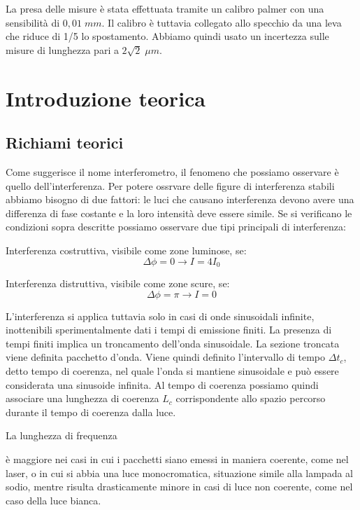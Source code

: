 \documentclass{article}
\begin{document}
La presa delle misure è stata effettuata tramite un calibro palmer con una sensibilità di $0,01 \; mm$. Il calibro è tuttavia collegato allo specchio da una leva che riduce di 1/5 lo spostamento. Abbiamo quindi usato un incertezza sulle misure di lunghezza pari a $2 \sqrt2 \; \mu m$.




\section{Introduzione teorica}
\subsection{Richiami teorici}
Come suggerisce il nome interferometro, il fenomeno che possiamo osservare è quello dell'interferenza. 
Per potere ossrvare delle figure di interferenza stabili abbiamo bisogno di due fattori: le luci che causano interferenza devono avere una differenza di fase costante e la loro intensità deve essere simile. Se si verificano le condizioni sopra descritte possiamo osservare due tipi principali di interferenza:

Interferenza costruttiva, visibile come zone luminose, se:
\[ \Delta \phi = 0 \rightarrow I = 4 I_0 \]

Interferenza distruttiva, visibile come zone scure, se: 
\[ \Delta \phi = \pi \rightarrow I = 0 \]

L'interferenza si applica tuttavia solo in casi di onde sinusoidali infinite, inottenibili sperimentalmente dati i tempi di emissione finiti. La presenza di tempi finiti implica un troncamento dell'onda sinusoidale. La sezione troncata viene definita pacchetto d'onda. Viene quindi definito l'intervallo di tempo $\Delta t_c$, detto tempo di coerenza, nel quale l'onda si mantiene sinusoidale e può essere considerata una sinusoide infinita. Al tempo di coerenza possiamo quindi associare una lunghezza di coerenza $L_c$ corrispondente allo spazio percorso durante il tempo di coerenza dalla luce.

La lunghezza di frequenza  è maggiore nei casi in cui i pacchetti siano emessi in maniera coerente, come nel laser, o in cui si abbia una luce monocromatica, situazione simile alla lampada al sodio, mentre risulta drasticamente minore in casi di luce non coerente, come nel caso della luce bianca.
\end{document}

